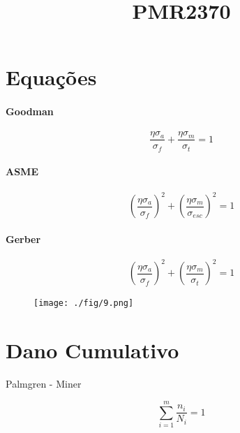 \documentclass[a4paper, 12pt]{article}
\title{PMR2370}
\begin{document}
\maketitle

\section{Equações}

\paragraph*{Goodman}
\begin{equation}
\frac{\eta \sigma _{a}}{\sigma _{f}}+\frac{\eta \sigma _{m}}{\sigma _{t}}=1
\end{equation}

\paragraph*{ASME}
\begin{equation}
\left( \frac{\eta \sigma _{a}}{\sigma _{f}} \right)^{2}+ \left(  \frac{\eta \sigma _{m}}{\sigma _{esc}} \right)^{2} = 1
\end{equation}


\paragraph*{Gerber}
\begin{equation}
\left( \frac{\eta \sigma _{a}}{\sigma _{f}} \right)^{2}+ \left(  \frac{\eta \sigma _{m}}{\sigma _{t}} \right)^{2} = 1
\end{equation}

\begin{figure}[h]
\begin{center}
\texttt{[image: ./fig/9.png]}
\caption{\label{fig:9}} 
\end{center}
\end{figure}

\section{Dano Cumulativo}
Palmgren - Miner

\[\sum _{i=1}^{m} {\frac{n_{i}}{N_{i}}}=1\]
\end{document}
